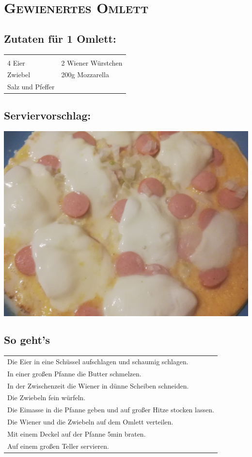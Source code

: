 \section{\textsc{Gewienertes Omlett}}

\subsection*{Zutaten für 1 Omlett:}

\begin{tabular}{p{7.5cm} p{7.5cm}}
	& \\
	4 Eier & 2 Wiener Würstchen \\
	\sfrac{1}{2} Zwiebel & 200g Mozzarella \\
	Salz und Pfeffer &
\end{tabular}

\subsection*{Serviervorschlag:}

\includegraphics[width=\textwidth]{img/omlett/omlett_wiener_fertig.jpg}

\subsection*{So geht's}

\begin{tabular}{p{15cm}}
	Die Eier in eine Schüssel aufschlagen und schaumig schlagen.\\
	In einer großen Pfanne die Butter schmelzen.\\
	In der Zwischenzeit die Wiener in dünne Scheiben schneiden.\\
	Die Zwiebeln fein würfeln.\\
	Die Eimasse in die Pfanne geben und auf großer Hitze stocken lassen.\\
	Die Wiener und die Zwiebeln auf dem Omlett verteilen.\\
	Mit einem Deckel auf der Pfanne 5min braten.\\
	Auf einem großen Teller servieren.
\end{tabular}
